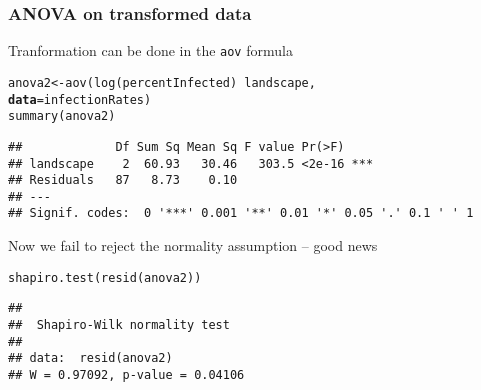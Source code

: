 \documentclass[color=usenames,dvipsnames]{beamer}\usepackage[]{graphicx}\usepackage[]{color}
\makeatletter
\newcommand{\hlopt}[1]{\textcolor[rgb]{0,0,0}{#1}}%
\newcommand{\hlstd}[1]{\textcolor[rgb]{0,0,0}{#1}}%
\newcommand{\hlkwb}[1]{\textcolor[rgb]{0,0.341,0.682}{#1}}%
\newcommand{\hlkwc}[1]{\textcolor[rgb]{0,0,0}{\textbf{#1}}}%
\newcommand{\hlkwd}[1]{\textcolor[rgb]{0.004,0.004,0.506}{#1}}%
\newenvironment{kframe}{%
 \def\at@end@of@kframe{}%
 \ifinner\ifhmode%
  \def\at@end@of@kframe{\end{minipage}}%
  \begin{minipage}{\columnwidth}%
 \fi\fi%
 \def\FrameCommand##1{\hskip\@totalleftmargin \hskip-\fboxsep
 \colorbox{shadecolor}{##1}\hskip-\fboxsep
     \hskip-\linewidth \hskip-\@totalleftmargin \hskip\columnwidth}%
 \MakeFramed {\advance\hsize-\width
   \@totalleftmargin\z@ \linewidth\hsize
   \@setminipage}}%
 {\par\unskip\endMakeFramed%
 \at@end@of@kframe}
\newenvironment{knitrout}{}{} %
\newcommand{\inr}[1]{\colorbox{inlinecolor}{\texttt{#1}}}
\makeatother
\begin{document}
\begin{frame}[fragile]
  \frametitle{ANOVA on transformed data}
  \small
  {Tranformation can be done in the \inr{aov} formula}
\begin{knitrout}\footnotesize
{}\color{fgcolor}\begin{kframe}
\begin{alltt}
\hlstd{anova2} \hlkwb{<-} \hlkwd{aov}\hlstd{(}\hlkwd{log}\hlstd{(percentInfected)}\hlopt{~}\hlstd{landscape,}
              \hlkwc{data}\hlstd{=infectionRates)}
\hlkwd{summary}\hlstd{(anova2)}
\end{alltt}
\begin{verbatim}
##             Df Sum Sq Mean Sq F value Pr(>F)    
## landscape    2  60.93   30.46   303.5 <2e-16 ***
## Residuals   87   8.73    0.10                   
## ---
## Signif. codes:  0 '***' 0.001 '**' 0.01 '*' 0.05 '.' 0.1 ' ' 1
\end{verbatim}
\end{kframe}
\end{knitrout}
  \pause
  \vfill
  {Now we fail to reject the normality assumption -- good news}
\begin{knitrout}\footnotesize
{}\color{fgcolor}\begin{kframe}
\begin{alltt}
\hlkwd{shapiro.test}\hlstd{(}\hlkwd{resid}\hlstd{(anova2))}
\end{alltt}
\begin{verbatim}
## 
## 	Shapiro-Wilk normality test
## 
## data:  resid(anova2)
## W = 0.97092, p-value = 0.04106
\end{verbatim}
\end{kframe}
\end{knitrout}
\end{frame}





\end{document}
